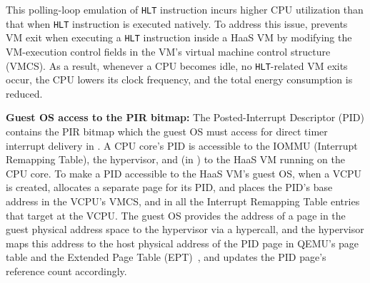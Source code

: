 {This polling-loop emulation of {\tt HLT} instruction incurs higher CPU utilization than that when {\tt HLT} instruction is executed natively. 
To address this issue, \na prevents VM exit when executing a {\tt HLT} instruction inside a HaaS VM by modifying the VM-execution control fields 
in the VM's virtual machine control structure (VMCS).
As a result, whenever a CPU becomes idle, no {\tt HLT}-related VM exits occur, the CPU lowers its clock frequency, and the total energy consumption is reduced. 

}

{\bf Guest OS access to the PIR bitmap:}
The Posted-Interrupt Descriptor (PID) contains the PIR bitmap 
which the guest OS must access for direct timer interrupt delivery in \sna.
A CPU core's PID is accessible to the IOMMU (Interrupt Remapping Table), 
the hypervisor, and (in \sna) to  the HaaS VM running on the CPU core. 
To make a PID accessible to the HaaS VM's guest OS,
when a VCPU is created, \na allocates a separate page for its PID, 
and places the PID's base address in the VCPU's VMCS, and 
in all the Interrupt Remapping Table entries that target at the VCPU.
The guest OS provides the address of a page in the guest physical address 
space to the hypervisor via a hypercall, and the hypervisor maps this address 
to the host physical address of the PID page in QEMU's page table and 
the Extended Page Table (EPT)~\cite{ept-wiki}, and updates the 
PID page's reference count accordingly.
   

